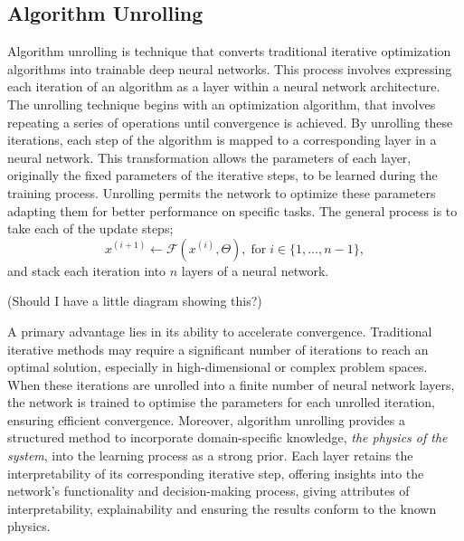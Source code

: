 \subsection{Algorithm Unrolling}

\IEEEPARstart{}{} Algorithm unrolling is technique that converts traditional iterative optimization algorithms into trainable deep neural networks. This process involves expressing each iteration of an algorithm as a layer within a neural network architecture. The unrolling technique begins with an optimization algorithm, that involves repeating a series of operations until convergence is achieved. By unrolling these iterations, each step of the algorithm is mapped to a corresponding layer in a neural network. This transformation allows the parameters of each layer, originally the fixed parameters of the iterative steps, to be learned during the training process. Unrolling permits the network to optimize these parameters adapting them for better performance on specific tasks. The general process is to take each of the update steps;
\begin{equation*}x^{(i+1)} \leftarrow \mathcal{F}(x^{(i)}, \Theta), \;\mathrm{for}\; i \in \{1, \dots, n - 1\},
\end{equation*}
and stack each iteration into $n$ layers of a neural network. 

\color{red}(Should I have a little diagram showing this?)\color{black}

\IEEEPARstart{}{} A primary advantage lies in its ability to accelerate convergence. Traditional iterative methods may require a significant number of iterations to reach an optimal solution, especially in high-dimensional or complex problem spaces. When these iterations are unrolled into a finite number of neural network layers, the network is trained to optimise the parameters for each unrolled iteration, ensuring efficient convergence. Moreover, algorithm unrolling provides a structured method to incorporate domain-specific knowledge, \textit{the physics of the system}, into the learning process as a strong prior. Each layer retains the interpretability of its corresponding iterative step, offering insights into the network's functionality and decision-making process, giving attributes of interpretability, explainability and ensuring the results conform to the known physics.

